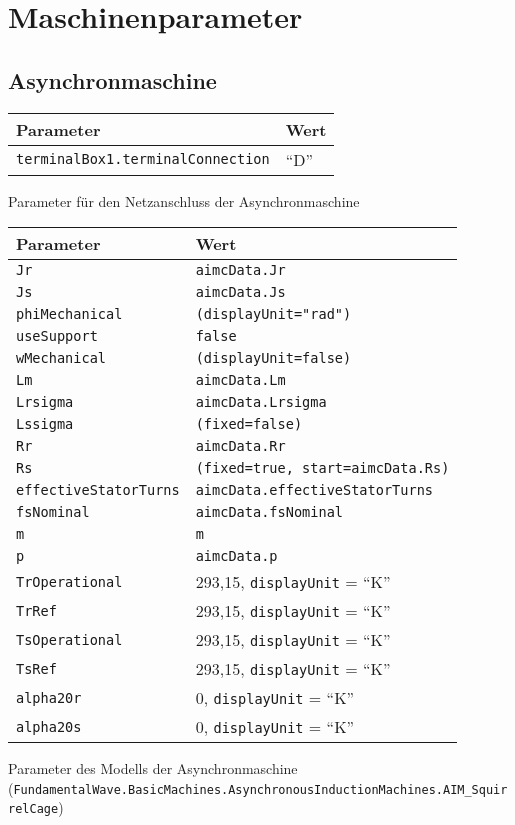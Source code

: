 \hypertarget{maschinenparameter}{%
\section{Maschinenparameter}\label{maschinenparameter}}

\hypertarget{asynchronmaschine}{%
\subsection{Asynchronmaschine}\label{asynchronmaschine}}

\begin{longtable}[]{@{}ll@{}}
\toprule
Parameter & Wert\tabularnewline
\midrule
\endhead
\texttt{terminalBox1.terminalConnection} & ``D''\tabularnewline
\bottomrule
\end{longtable}

Parameter für den Netzanschluss der Asynchronmaschine

\begin{longtable}[]{@{}ll@{}}
\toprule
Parameter & Wert\tabularnewline
\midrule
\endhead
\texttt{Jr} & \texttt{aimcData.Jr}\tabularnewline
\texttt{Js} & \texttt{aimcData.Js}\tabularnewline
\texttt{phiMechanical} & \texttt{(displayUnit="rad")}\tabularnewline
\texttt{useSupport} & \texttt{false}\tabularnewline
\texttt{wMechanical} & \texttt{(displayUnit=false)}\tabularnewline
\texttt{Lm} & \texttt{aimcData.Lm}\tabularnewline
\texttt{Lrsigma} & \texttt{aimcData.Lrsigma}\tabularnewline
\texttt{Lssigma} & \texttt{(fixed=false)}\tabularnewline
\texttt{Rr} & \texttt{aimcData.Rr}\tabularnewline
\texttt{Rs} & \texttt{(fixed=true,\ start=aimcData.Rs)}\tabularnewline
\texttt{effectiveStatorTurns} &
\texttt{aimcData.effectiveStatorTurns}\tabularnewline
\texttt{fsNominal} & \texttt{aimcData.fsNominal}\tabularnewline
\texttt{m} & \texttt{m}\tabularnewline
\texttt{p} & \texttt{aimcData.p}\tabularnewline
\texttt{TrOperational} & 293,15, \texttt{displayUnit} =
``K''\tabularnewline
\texttt{TrRef} & 293,15, \texttt{displayUnit} = ``K''\tabularnewline
\texttt{TsOperational} & 293,15, \texttt{displayUnit} =
``K''\tabularnewline
\texttt{TsRef} & 293,15, \texttt{displayUnit} = ``K''\tabularnewline
\texttt{alpha20r} & 0, \texttt{displayUnit} = ``K''\tabularnewline
\texttt{alpha20s} & 0, \texttt{displayUnit} = ``K''\tabularnewline
\bottomrule
\end{longtable}

Parameter des Modells der Asynchronmaschine
(\texttt{FundamentalWave.BasicMachines.AsynchronousInductionMachines.AIM\_SquirrelCage})


